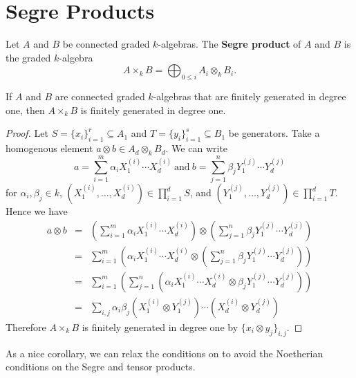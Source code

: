 \section{Segre Products}
\begin{definition}\label{def: segre product}
  Let \(A\) and \(B\) be connected graded \(k\)-algebras.
  The \textbf{Segre product} of \(A\) and \(B\) is the graded \(k\)-algebra
  \[ A \times_k B = \bigoplus_{0 \leq i} A_i \otimes_k B_i.\]
\end{definition}

\begin{proposition}\label{proposition: segre product of generated in degree 1 is generated in degree 1}
  If \(A\) and \(B\) are connected graded \(k\)-algebras that are finitely generated in degree one, then \(A \times_k B\) is finitely generated in degree one.
\end{proposition}

\begin{proof}
  Let \(S = \{x_i\}_{i = 1}^r \subseteq A_1\) and \(T = \{y_i\}_{i = 1}^s \subseteq B_1\) be generators.
  Take a homogenous element \(a \otimes b \in A_d \otimes_k B_d\).
  We can write
  \[a = \sum_{i = 1}^m \alpha_i X_1^{(i)} \cdots X_d^{(i)}\ \text{and}\ b = \sum_{j = 1}^n \beta_j Y_1^{(j)} \cdots Y_d^{(j)}\]
  for \(\alpha_i,\beta_j \in k\), \((X_1^{(i)}, \ldots, X_d^{(i)}) \in \prod_{i = 1}^d S\), and \((Y_1^{(j)}, \ldots, Y_d^{(j)}) \in \prod_{i = 1}^d T\).
  Hence we have
  \begin{eqnarray*}
    a \otimes b &=& \left(\sum_{i=1}^m \alpha_i X_1^{(i)} \cdots X_d^{(i)}\right) \otimes \left(\sum_{j = 1}^n \beta_j Y_1^{(j)} \cdots Y_d^{(j)}\right)\\
    &=& \sum_{i = 1}^m\left(\alpha_i X_1^{(i)} \cdots X_d^{(i)} \otimes \left(\sum_{j = 1}^n \beta_j Y_1^{(j)} \cdots Y_d^{(j)}\right)\right)\\
    &=& \sum_{i = 1}^m\left(\sum_{j = 1}^n\left(\alpha_i  X_1^{(i)} \cdots X_d^{(i)} \otimes \beta_j Y_1^{(j)} \cdots Y_d^{(j)}\right)\right)\\
    &=& \sum_{i,j} \alpha_i\beta_j (X_1^{(i)} \otimes Y_1^{(j)}) \cdots (X_d^{(i)} \otimes Y_d^{(j)})
  \end{eqnarray*}
    Therefore \(A \times_k B\) is finitely generated in degree one by \(\{x_i \otimes y_j\}_{i,j}\).
\end{proof}

As a nice corollary, we can relax the conditions on \cite[Theorem 2.4]{VR96} to avoid the Noetherian conditions on the Segre and tensor products.

